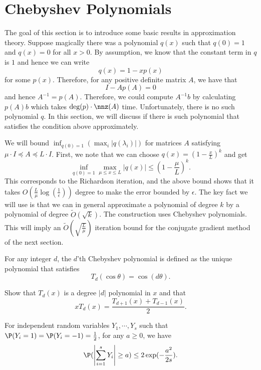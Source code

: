 %

\section{Chebyshev Polynomials\label{sec:Chebyshev-Polynomials}}

The goal of this section is to introduce some basic results in approximation
theory. Suppose magically there was a polynomial $q(x)$ such that
$q(0)=1$ and $q(x)=0$ for all $x>0$. By assumption, we know that
the constant term in $q$ is $1$ and hence we can write 
\[
q(x)=1-xp(x)
\]
for some $p(x)$. Therefore, for any positive definite matrix $A$,
we have that
\[
I-Ap(A)=0
\]
and hence $A^{-1}=p(A).$ Therefore, we could compute $A^{-1}b$ by
calculating $p(A)b$ which takes $\text{deg}(p)\cdot\nnz(A)$ time.
Unfortunately, there is no such polynomial $q$. In this section,
we will discuss if there is such polynomial that satisfies the condition
above approximately. 

We will bound $\inf_{q(0)=1}\left(\max_{i}\left|q(\lambda_{i})\right|\right)$
for matrices $A$ satisfying $\mu\cdot I\preceq A\preceq L\cdot I$.
First, we note that we can choose $q(x)=\left(1-\frac{x}{L}\right)^{k}$
and get
\[
\inf_{q(0)=1}\max_{\mu\leq x\leq L}\left|q(x)\right|\leq\left(1-\frac{\mu}{L}\right)^{k}.
\]
This corresponds to the Richardson iteration, and the above bound
shows that it takes $O(\frac{L}{\mu}\log(\frac{1}{\epsilon}))$ degree
to make the error bounded by $\epsilon$. The key fact we will use
is that we can in general approximate a polynomial of degree $k$
by a polynomial of degree $\tilde{O}(\sqrt{k})$. The construction
uses Chebyshev polynomials. This will imply an $\tilde{O}(\sqrt{\frac{L}{\mu}})$
iteration bound for the conjugate gradient method of the next section.
\begin{defn}
For any integer $d$, the $d$'th Chebyshev polynomial is defined
as the unique polynomial that satisfies 
\[
T_{d}(\cos\theta)=\cos(d\theta).
\]
\end{defn}

\begin{xca}
Show that $T_{d}(x)$ is a degree $|d|$ polynomial in $x$ and that
\begin{equation}
xT_{d}(x)=\frac{T_{d+1}(x)+T_{d-1}(x)}{2}.\label{eq:T_avg_recursion}
\end{equation}
\end{xca}

\begin{thm}
\label{thm:chernoff}For independent random variables $Y_{1},\cdots,Y_{s}$
such that $\P(Y_{i}=1)=\P(Y_{i}=-1)=\frac{1}{2}$, for any $a\geq0$,
we have
\[
\P(\left|\sum_{i=1}^{s}Y_{i}\right|\geq a)\leq2\exp(-\frac{a^{2}}{2s}).
\]
\end{thm}

